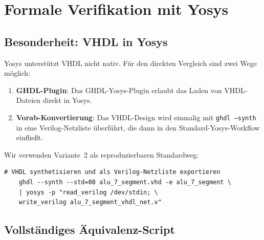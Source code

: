 ﻿\documentclass[12pt,a4paper]{report}
\begin{document}
\section{Formale Verifikation mit Yosys}
\label{subsec:yosys_direkt}

\subsection{Besonderheit: VHDL in Yosys}

Yosys unterstützt VHDL nicht nativ.  Für den direkten Vergleich sind zwei
Wege möglich:

\begin{enumerate}
	\item \textbf{GHDL-Plugin}: Das GHDL-Yosys-Plugin \cite{ghdl2024} erlaubt
	das Laden von VHDL-Dateien direkt in Yosys.
	\item \textbf{Vorab-Konvertierung}: Das VHDL-Design wird einmalig mit
	\texttt{ghdl --synth} in eine Verilog-Netzliste überführt, die dann
	in den Standard-Yosys-Workflow einfließt.
\end{enumerate}

Wir verwenden Variante~2 als reproduzierbaren Standardweg:

\begin{lstlisting}[style=bashstyle, caption={VHDL zu Verilog via GHDL-Synthese}]
	# VHDL synthetisieren und als Verilog-Netzliste exportieren
	ghdl --synth --std=08 alu_7_segment.vhd -e alu_7_segment \
	| yosys -p "read_verilog /dev/stdin; \
	write_verilog alu_7_segment_vhdl_net.v"
\end{lstlisting}

\subsection{Vollständiges Äquivalenz-Script}
\end{document}
